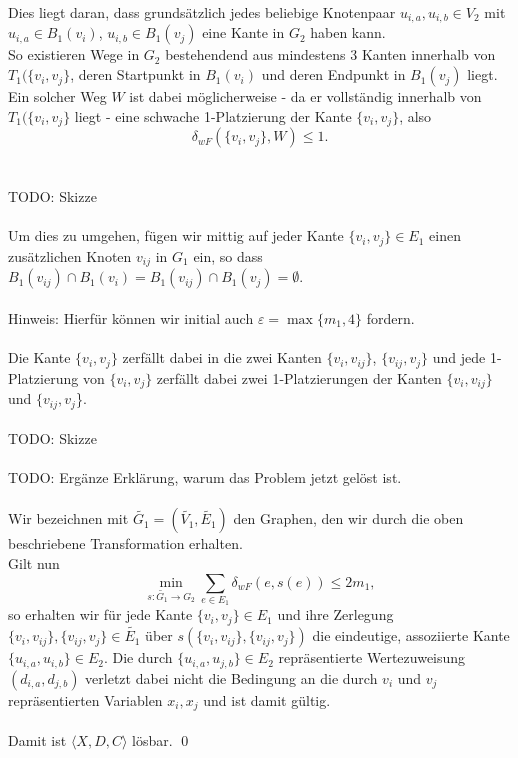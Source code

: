 \documentclass[a4paper, 12pt, twoside]{article}
\theoremstyle{Format1} %
\begin{document}
Dies liegt daran, dass grundsätzlich jedes beliebige Knotenpaar $u_{i,a}, u_{i,b} \in V_2$ mit $u_{i,a} \in B_1(v_i)$, $u_{i,b} \in B_1(v_j)$ eine Kante in $G_2$ haben kann.
\\
So existieren Wege in $G_2$ bestehendend aus mindestens 3 Kanten innerhalb von $T_1(\{v_i, v_j\}$, deren Startpunkt in $B_1(v_i)$ und deren Endpunkt in $B_1(v_j)$ liegt.
Ein solcher Weg $W$ ist dabei möglicherweise - da er vollständig innerhalb von $T_1(\{v_i, v_j\}$ liegt - eine schwache 1-Platzierung der Kante $\{v_i, v_j\}$, also
$$ \delta_{wF}(\{v_i, v_j\}, W) \leq 1.$$
\\
\\
TODO: Skizze
\\
\\
Um dies zu umgehen, fügen wir mittig auf jeder Kante $\{v_i, v_j\} \in E_1$ einen zusätzlichen Knoten $v_{ij}$ in $G_1$ ein,
so dass $B_1(v_{ij}) \cap B_1(v_i) = B_1(v_{ij}) \cap B_1(v_j) = \emptyset$.
\\
\\
Hinweis: Hierfür können wir initial auch $\varepsilon = \max \{m_1, 4\}$ fordern.
\\
\\
Die Kante $\{v_i, v_j\}$ zerfällt dabei in die zwei Kanten $\{v_i, v_{ij}\}$, $\{v_{ij},v_j\}$ und
jede 1-Platzierung von $\{v_i, v_j\}$ zerfällt dabei zwei 1-Platzierungen der Kanten $\{v_i, v_{ij}\}$ und $\{v_{ij}, v_j$\}.
\\
\\
TODO: Skizze
\\
\\
TODO: Ergänze Erklärung, warum das Problem jetzt gelöst ist.
\\
\\
Wir bezeichnen mit $\tilde{G_1}=(\tilde{V_1}, \tilde{E_1})$ den Graphen, den wir durch die oben beschriebene Transformation erhalten.
\\
Gilt nun
$$ \min_{s: \tilde{G_1} \to G_2} \sum_{e \in E_1} \delta_{wF}(e, s(e)) \leq 2m_1, $$
so erhalten wir für jede Kante $\{v_i, v_j\} \in E_1$ und ihre Zerlegung $\{v_i, v_{ij}\},\{v_{ij}, v_j\} \in \tilde{E_1}$
über $s(\{v_i, v_{ij}\},\{v_{ij}, v_j\})$ die eindeutige, assoziierte Kante $\{u_{i,a}, u_{i,b}\} \in E_2$.
Die durch $\{u_{i,a}, u_{j,b}\} \in E_2$ repräsentierte Wertezuweisung $(d_{i,a}, d_{j,b})$ verletzt dabei nicht die Bedingung an die
durch $v_i$ und $v_j$ repräsentierten Variablen $x_i, x_j$ und ist damit gültig.
\\
\\
Damit ist $\langle X,D,C \rangle$ lösbar. \qed
\\
\\
\end{document}
